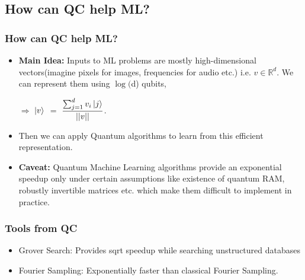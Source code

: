 \documentclass{beamer}
\begin{document}
\subsection{How can QC help ML?}
\begin{frame}\frametitle{How can QC help ML?}
\begin{itemize}
\item \textbf{Main Idea:} Inputs to ML problems are mostly 
high-dimensional vectors(imagine pixels for images, frequencies for audio etc.) i.e. $v \in \mathbb{R}^d$.
We can represent them using $\log($d) qubits,

$\Rightarrow$ $\ket{v}$ $=$ $\dfrac{\sum_{j=1}^{d} v_{i}\ket{j}}{||v||}$.

\item Then we can apply Quantum algorithms to learn from this efficient representation.
\item \textbf{Caveat:} Quantum Machine Learning algorithms provide an exponential speedup only under 
certain assumptions like existence of quantum RAM,  robustly invertible matrices etc. which make them 
difficult to implement in practice.

\end{itemize} 
\end{frame}

\begin{frame}\frametitle{Tools from QC}
\begin{itemize}
\item Grover Search: Provides sqrt speedup while searching unstructured databases
\item Fourier Sampling: Exponentially faster than classical Fourier Sampling.
\end{itemize} 
\end{frame}
\end{document}
